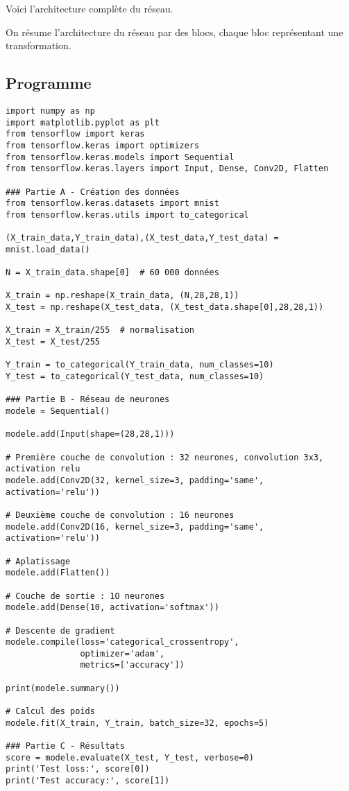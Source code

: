 \documentclass[11pt,class=report,crop=false]{standalone}
\begin{document}
Voici l'architecture complète du réseau.


On résume l'architecture du réseau par des blocs, chaque bloc représentant une transformation.

\subsection{Programme}

\begin{lstlisting}
import numpy as np
import matplotlib.pyplot as plt
from tensorflow import keras
from tensorflow.keras import optimizers
from tensorflow.keras.models import Sequential
from tensorflow.keras.layers import Input, Dense, Conv2D, Flatten

### Partie A - Création des données
from tensorflow.keras.datasets import mnist
from tensorflow.keras.utils import to_categorical

(X_train_data,Y_train_data),(X_test_data,Y_test_data) = mnist.load_data()

N = X_train_data.shape[0]  # 60 000 données

X_train = np.reshape(X_train_data, (N,28,28,1))
X_test = np.reshape(X_test_data, (X_test_data.shape[0],28,28,1))

X_train = X_train/255  # normalisation
X_test = X_test/255

Y_train = to_categorical(Y_train_data, num_classes=10)
Y_test = to_categorical(Y_test_data, num_classes=10)

### Partie B - Réseau de neurones
modele = Sequential()

modele.add(Input(shape=(28,28,1)))

# Première couche de convolution : 32 neurones, convolution 3x3, activation relu
modele.add(Conv2D(32, kernel_size=3, padding='same', activation='relu'))

# Deuxième couche de convolution : 16 neurones
modele.add(Conv2D(16, kernel_size=3, padding='same', activation='relu'))

# Aplatissage 
modele.add(Flatten())

# Couche de sortie : 1O neurones
modele.add(Dense(10, activation='softmax'))

# Descente de gradient
modele.compile(loss='categorical_crossentropy',
               optimizer='adam',
               metrics=['accuracy'])

print(modele.summary())

# Calcul des poids
modele.fit(X_train, Y_train, batch_size=32, epochs=5)

### Partie C - Résultats
score = modele.evaluate(X_test, Y_test, verbose=0)
print('Test loss:', score[0])
print('Test accuracy:', score[1])
\end{lstlisting}
\end{document}
